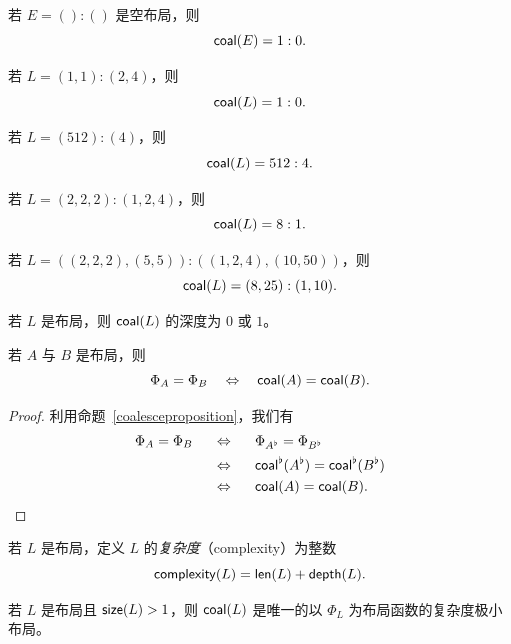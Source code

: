 \begin{example}
    若 $E = ():()$ 是空布局，则
    \[
    \mathsf{coal}(E) = 1:0.
    \]
\end{example}
\begin{example}
    若 $L = (1,1):(2,4)$，则
    \[
    \mathsf{coal}(L) = 1:0.
    \]
\end{example}
\begin{example}
    若 $L = (512):(4)$，则
    \[
    \mathsf{coal}(L) = 512:4.
    \]
\end{example}
\begin{example}
    若 $L = (2,2,2):(1,2,4)$，则
    \[
    \mathsf{coal}(L) = 8:1.
    \]
\end{example}
\begin{example}
    若 $L = ((2,2,2),(5,5)):((1,2,4),(10,50))$，则
    \[
    \mathsf{coal}(L) = (8,25):(1,10).
    \]
\end{example}

\begin{remark} 若 $L$ 是布局，则 $\mathsf{coal}(L)$ 的深度为 $0$ 或 $1$。
\end{remark}

\begin{proposition}\label{nestedcoalesceproposition}
    若 $A$ 与 $B$ 是布局，则
    \[\Phi_A =\Phi_B \quad \Leftrightarrow \quad \mathsf{coal}(A) = \mathsf{coal}(B).\]
\end{proposition}
\begin{proof}
    利用命题~\ref{coalesceproposition}，我们有
    \begin{align*}
    \Phi_A = \Phi_B \hspace{0.2in} & \Leftrightarrow \hspace{0.2in} \Phi_{A^\flat} = \Phi_{B^\flat} \\
    & \Leftrightarrow \hspace{0.2in} \mathsf{coal}^\flat(A^\flat) = \mathsf{coal}^\flat ( B^\flat ) \\
    & \Leftrightarrow \hspace{0.2in} \mathsf{coal}(A) = \mathsf{coal} ( B ).
    \end{align*}
\end{proof}

\begin{definition}
    若 $L$ 是布局，定义 $L$ 的{\it 复杂度}（complexity）为整数
    \[
    \mathsf{complexity}(L) = \mathsf{len}(L) + \mathsf{depth}(L).
    \]
\end{definition}

\begin{proposition}
    若 $L$ 是布局且 $\mathsf{size}(L) >1$，则 $\mathsf{coal}(L)$ 是唯一的以 $\Phi_L$ 为布局函数的复杂度极小布局。
\end{proposition}

